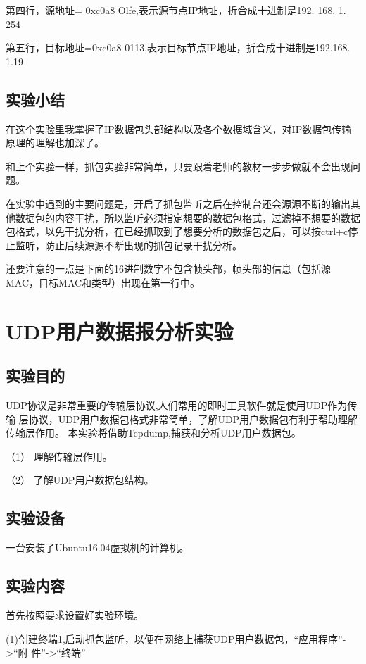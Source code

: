 \documentclass[lang=cn,11pt,a4paper,cite=authoryear]{elegantpaper}
\begin{document}
第四行，源地址= 0xc0a8 Olfe,表示源节点IP地址，折合成十进制是192. 168. 1. 254

第五行，目标地址=0xc0a8 0113,表示目标节点IP地址，折合成十进制是192.168. 1.19


\subsection{实验小结}

在这个实验里我掌握了IP数据包头部结构以及各个数据域含义，对IP数据包传输原理的理解也加深了。

和上个实验一样，抓包实验非常简单，只要跟着老师的教材一步步做就不会出现问题。

在实验中遇到的主要问题是，开启了抓包监听之后在控制台还会源源不断的输出其他数据包的内容干扰，所以监听必须指定想要的数据包格式，过滤掉不想要的数据包格式，以免干扰分析，在已经抓取到了想要分析的数据包之后，可以按ctrl+c停止监听，防止后续源源不断出现的抓包记录干扰分析。

还要注意的一点是下面的16进制数字不包含帧头部，帧头部的信息（包括源MAC，目标MAC和类型）出现在第一行中。

\section{UDP用户数据报分析实验}
\subsection{实验目的}

UDP协议是非常重要的传输层协议,人们常用的即时工具软件就是使用UDP作为传输 层协议，UDP用户数据包格式非常简单，了解UDP用户数据包有利于帮助理解传输层作用。 本实验将借助Tcpdump,捕获和分析UDP用户数据包。

（1）	理解传输层作用。

（2）	了解UDP用户数据包结构。

\subsection{实验设备}
一台安装了Ubuntu16.04虚拟机的计算机。

\subsection{实验内容}

首先按照要求设置好实验环境。

(1)创建终端1,启动抓包监听，以便在网络上捕获UDP用户数据包，“应用程序”->“附
件”->“终端”
\end{document}
